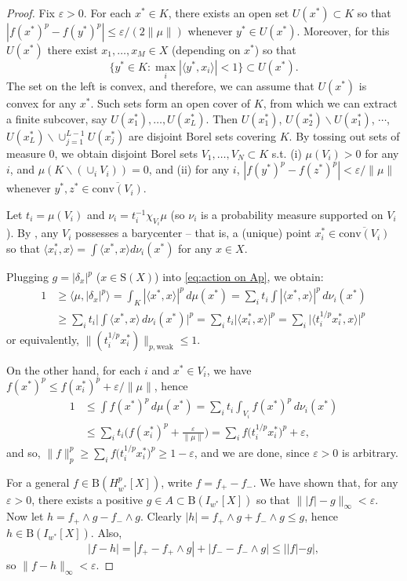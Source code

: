 \documentclass{amsart}
\theoremstyle{plain}
\theoremstyle{definition}
\numberwithin{equation}{section}
\newcommand{\vr}{\varepsilon}
\newcommand{\ball}{\mathrm{B}}
\newcommand{\sphere}{\textrm{S}}
\newcommand{\Hp}{H_{w^*}^{p}}
\begin{document}
\begin{proof}
Fix $\vr > 0$. For each $x^* \in K$, there exists an open set $U(x^*) \subset K$ so that $|f(x^*)^p - f(y^*)^p| \leq \vr/(2\|\mu\|)$ whenever $y^* \in U(x^*)$. Moreover, for this $U(x^*)$ there exist $x_1, \ldots, x_M \in X$ (depending on $x^*$) so that
$$
\big\{ y^* \in K : \max_i | \langle y^*, x_i \rangle | < 1 \big\} \subset U(x^*) .
$$
The set on the left is convex, and therefore, we can assume that $U(x^*)$ is convex for any $x^*$. Such sets form an open cover of $K$, from which we can extract a finite subcover, say $U(x_1^*), \ldots, U(x_L^*)$.
Then $U(x_1^*)$, $U(x_2^*) \backslash U(x_1^*)$, $\cdots$, $U(x_L^*) \backslash \cup_{j=1}^{L-1} U(x_j^*)$ are disjoint Borel sets covering $K$. By tossing out sets of measure $0$, we obtain disjoint Borel sets $V_1, \ldots, V_N \subset K$ s.t. (i) $\mu(V_i) > 0$ for any $i$, and $\mu(K \backslash (\cup_i V_i)) = 0$, and (ii) for any $i$, $|f(y^*)^p - f(z^*)^p| < \vr/\|\mu\|$ whenever $y^*, z^* \in \overline{{\textrm{conv}}(V_i)}$. 

Let $t_i = \mu(V_i)$ and $\nu_i = t_i^{-1} \chi_{V_i} \mu$ (so $\nu_i$ is a probability measure supported on $V_i$). By \cite[Theorem 1.1]{Phelps}, any $V_i$ possesses a barycenter -- that is, a (unique) point $x_i^* \in \overline{{\textrm{conv}}(V_i)}$ so that $\langle x_i^*, x \rangle = \int \langle x^*, x \rangle d\nu_i(x^*)$ for any $x \in X$. 

Plugging $g = |\delta_x|^p$ ($x \in \sphere(X)$) into \eqref{eq:action on Ap}, we obtain:
\begin{align*}
1 
& 
\geq \big\langle \mu, |\delta_x|^p \big\rangle = \int_K | \langle x^*, x \rangle|^p \, d\mu(x^*) = \sum_i t_i \int | \langle x^*, x \rangle|^p \, d\nu_i(x^*)
\\ &
\geq \sum_i t_i \Big| \int \langle x^*, x \rangle  \, d\nu_i(x^*) \Big|^p = \sum_i t_i \big| \langle x_i^*, x \rangle \big|^p  = \sum_i \big| \langle t_i^{1/p} x_i^*, x \rangle \big|^p 
\end{align*}
or equivalently, $\|(t_i^{1/p} x_i^*)\|_{p,{\textrm{weak}}} \leq 1$.

On the other hand, for each $i$ and $x^* \in V_i$, we have $f(x^*)^p \leq f(x_i^*)^p + \vr/\|\mu\|$, hence
\begin{align*}
1 
&
\leq \int f(x^*)^p \, d\mu(x^*) = \sum_i t_i \int_{V_i} f(x^*)^p \, d\nu_i(x^*) 
\\ &
\leq \sum_i t_i \Big( f(x_i^*)^p + \frac{\vr}{\|\mu\|} \Big) = \sum_i f\big( t_i^{1/p} x_i^* \big)^p + \vr ,
\end{align*}
and so, $\|f\|_p^p \geq \sum_i f\big( t_i^{1/p} x_i^* \big)^p \geq 1-\vr$, and we are done, since $\vr>0$ is arbitrary.

For a general $f \in \ball(\Hp[X])$, write $f = f_+ - f_-$. We have shown that, for any $\vr > 0$, there exists a positive $g \in A \subset \ball(I_{w^*}[X])$ so that $\| |f| - g \|_\infty < \vr$.
Now let $h = f_+ \wedge g - f_- \wedge g$. Clearly $|h| = f_+ \wedge g + f_- \wedge g \leq g$, hence $h \in \ball(I_{w^*}[X])$. Also, $$|f - h| = |f_+ - f_+ \wedge g| + |f_- - f_- \wedge g| \leq ||f|-g|,$$ so $\|f - h\|_\infty < \vr$.
\end{proof}
\end{document}
